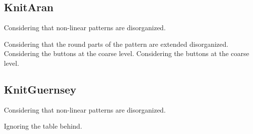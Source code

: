 \clearpage
\renewcommand{\mat}{KnitAran}
\subsection{\mat}
Considering that non-linear patterns are disorganized.

\renewcommand{\Number}{01}\InputImage{\sexor}{\tco}{\sexdi}{\tbu}{\sexdi}{\tbu}
{}{}
\renewcommand{\Number}{02}\InputImage{\sexdi}{\tco}{\sexdi}{\tbu}{\sexdi}{\tbu}
{}{}
\renewcommand{\Number}{03}\InputImage{\sexor}{\tco}{\sexdi}{\tbu}{\sexdi}{\tbu}
{}{Considering that the round parts of the pattern are extended disorganized.}
\renewcommand{\Number}{04}\InputImage{\sexor}{\tco}{\sexdi}{\tbu}{\sro}{\tbu}
{}{Considering the buttons at the coarse level.}
\renewcommand{\Number}{05}\InputImage{\sexor}{\tco}{\sexdi}{\tbu}{\sro}{\tbu}
{}{}
\renewcommand{\Number}{06}\InputImage{\sexor}{\tco}{\sexdi}{\tbu}{\sro}{\tbu}
{}{}
\renewcommand{\Number}{07}\InputImage{\sexor}{\tco}{\sexor}{\tco}{\sexdi}{\tbu}
{}{}
\renewcommand{\Number}{08}\InputImage{\sexdi}{\tco}{\sexdi}{\tco}{\sexdi}{\tbu}
{}{}
\renewcommand{\Number}{09}\InputImage{\sexor}{\tco}{\sexdi}{\tbu}{\sexdi}{\tbu}
{}{}
\renewcommand{\Number}{10}\InputImage{\sexor}{\tco}{\sexor}{\tco}{\sexdi}{\tbu}
{}{}
\renewcommand{\Number}{11}\InputImage{\sexor}{\tco}{\sexdi}{\tbu}{\sro}{\tbu}
{}{Considering the buttons at the coarse level.}
\renewcommand{\Number}{12}\InputImage{\sexor}{\tco}{\sexdi}{\tbu}{\sexdi}{\tbu}
{}{}

\clearpage
\renewcommand{\mat}{KnitGuernsey}
\subsection{\mat}
Considering that non-linear patterns are disorganized.

\renewcommand{\Number}{01}\InputImage{\sexor}{\tco}{\sexor}{\tco}{\sexdi}{\tbu}
{}{}
\renewcommand{\Number}{02}\InputImage{\sexor}{\tco}{\sexor}{\tco}{\sexdi}{\tco}
{}{Ignoring the table behind.}
\renewcommand{\Number}{03}\InputImage{\sro}{\tco}{\sro}{\tco}{\sexdi}{\tbu}
{}{}
\renewcommand{\Number}{04}\InputImage{\sro}{\tco}{\sro}{\tco}{\sexor}{\tbu}
{}{}
\renewcommand{\Number}{05}\InputImage{\sexor}{\tco}{\sexor}{\tco}{\sexdi}{\tbu}
{}{}
\renewcommand{\Number}{06}\InputImage{\sexdi}{\tco}{\sexdi}{\tco}{\sexdi}{\tbu}
{}{}
\renewcommand{\Number}{07}\InputImage{\sro}{\tco}{\sexdi}{\tco}{\sexdi}{\tbu}
{}{}
\renewcommand{\Number}{08}\InputImage{\sexor}{\tco}{\sexor}{\tco}{\sexdi}{\tbu}
{}{}
\renewcommand{\Number}{09}\InputImage{\sro}{\tco}{\sro}{\tco}{\sexdi}{\tbu}
{}{}
\renewcommand{\Number}{10}\InputImage{\sro}{\tco}{\sro}{\tco}{\sexdi}{\tbu}
{}{}
\renewcommand{\Number}{11}\InputImage{\sro}{\tco}{\sro}{\tco}{\sexdi}{\tbu}
{}{}
\renewcommand{\Number}{12}\InputImage{\sro}{\tco}{\sexdi}{\tco}{\sexdi}{\tbu}
{}{}

